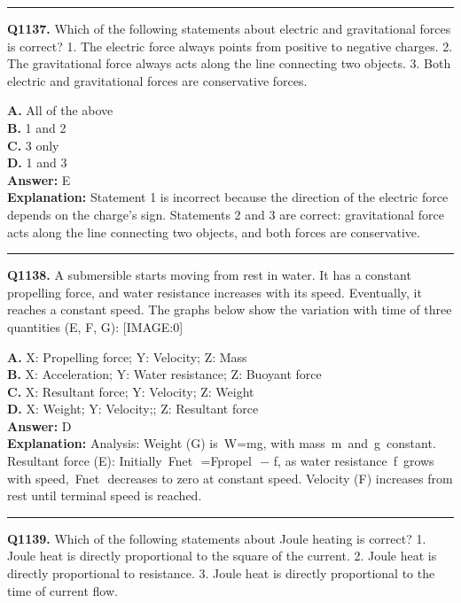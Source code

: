 \documentclass[12pt]{article}
\begin{document}
\hrule
\vspace{1em}


\noindent
\textbf{Q1137.} Which of the following statements about electric and gravitational forces is correct?
1.
The electric force always points from positive to negative charges.
2.
The gravitational force always acts along the line connecting two objects.
3.
Both electric and gravitational forces are conservative forces.



\textbf{A.} All of the above \\
\textbf{B.} 1 and 2 \\
\textbf{C.} 3 only \\
\textbf{D.} 1 and 3 \\

\textbf{Answer:} E \\
\textbf{Explanation:} Statement 1 is incorrect because the direction of the electric force depends on the charge's sign. Statements 2 and 3 are correct: gravitational force acts along the line connecting two objects, and both forces are conservative.

\hrule
\vspace{1em}


\noindent
\textbf{Q1138.} A submersible starts moving from rest in water. It has a constant propelling force, and water resistance increases with its speed. Eventually, it reaches a constant speed. The graphs below show the variation with time of three quantities (E, F, G):
[IMAGE:0]



\textbf{A.} X: Propelling force; Y: Velocity; Z: Mass \\
\textbf{B.} X: Acceleration; Y: Water resistance; Z: Buoyant force \\
\textbf{C.} X: Resultant force; Y: Velocity; Z: Weight \\
\textbf{D.} X: Weight; Y: Velocity;; Z: Resultant force \\

\textbf{Answer:} D \\
\textbf{Explanation:} Analysis: Weight (G) is W=mg, with mass m and g constant. Resultant force (E): Initially Fnet
​
=Fpropel
​
−
f, as water resistance f grows with speed, Fnet
​
decreases to zero at constant speed. Velocity (F) increases from rest until terminal speed is reached.

\hrule
\vspace{1em}


\noindent
\textbf{Q1139.} Which of the following statements about Joule heating is correct?
1.
Joule heat is directly proportional to the square of the current.
2.
Joule heat is directly proportional to resistance.
3.
Joule heat is directly proportional to the time of current flow.
\end{document}
